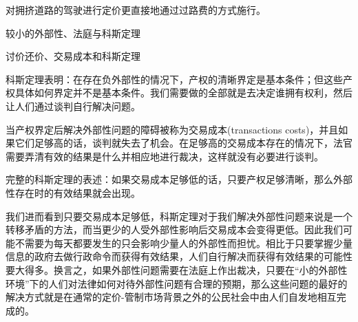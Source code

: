 \documentclass{article}
\begin{document}
对拥挤道路的驾驶进行定价更直接地通过过路费的方式施行。

\hspace*{\fill}

较小的外部性、法庭与科斯定理

讨价还价、交易成本和科斯定理

科斯定理表明：在存在负外部性的情况下，产权的清晰界定是基本条件；但这些产权具体如何界定并不是基本条件。我们需要做的全部就是去决定谁拥有权利，然后让人们通过谈判自行解决问题。

当产权界定后解决外部性问题的障碍被称为交易成本(transactions costs)，并且如果它们足够高的话，谈判就失去了机会。在足够高的交易成本存在的情况下，法官需要弄清有效的结果是什么并相应地进行裁决，这样就没有必要进行谈判。

完整的科斯定理的表述：如果交易成本足够低的话，只要产权足够清晰，那么外部性存在时的有效结果就会出现。

我们进而看到只要交易成本足够低，科斯定理对于我们解决外部性问题来说是一个转移矛盾的方法，而当更少的人受外部性影响后交易成本会变得更低。因此我们可能不需要为每天都要发生的只会影响少量人的外部性而担忧。相比于只要掌握少量信息的政府去做行政命令而获得有效结果，人们自行解决而获得有效结果的可能性要大得多。换言之，如果外部性问题需要在法庭上作出裁决，只要在“小的外部性环境”下的人们对法律如何对待外部性问题有合理的预期，那么这些问题的最好的解决方式就是在通常的定价-管制市场背景之外的公民社会中由人们自发地相互完成的。













































	
\end{document}
